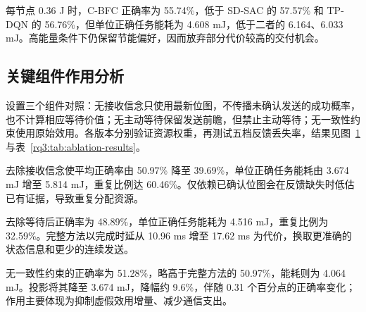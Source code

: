 每节点 0.36 J 时，C-BFC 正确率为 55.74\%，低于 SD-SAC 的 57.57\% 和 TP-DQN 的 56.76\%，但单位正确任务能耗为 4.608 mJ，低于二者的 6.164、6.033 mJ。高能量条件下仍保留节能偏好，因而放弃部分代价较高的交付机会。

\FloatBarrier
\subsection{关键组件作用分析}
\label{rq3:subsec:ablation}

设置三个组件对照：无接收信念只使用最新位图，不传播未确认发送的成功概率，也不计算相应等待价值；无主动等待保留发送前瞻，但禁止主动等待；无一致性约束使用原始效用。各版本分别验证资源权重，再测试五档反馈丢失率，结果见图~\ref{rq3:fig:ablation} 与表~\ref{rq3:tab:ablation-results}。

\begin{figure}[!htbp]
  \centering
  \par\vspace{2pt}{\footnotesize 完整方法与无接收信念、无主动等待、无一致性约束三个版本分别比较，子图指标与前四组一致。}
  \label{rq3:fig:ablation}
\end{figure}



去除接收信念使平均正确率由 50.97\% 降至 39.69\%，单位正确任务能耗由 3.674 mJ 增至 5.814 mJ，重复比例达 60.46\%。仅依赖已确认位图会在反馈缺失时低估已有证据，导致重复分配资源。

去除等待后正确率为 48.89\%，单位正确任务能耗为 4.516 mJ，重复比例为 32.59\%。完整方法以完成时延从 10.96 ms 增至 17.62 ms 为代价，换取更准确的状态信息和更少的连续发送。

无一致性约束的正确率为 51.28\%，略高于完整方法的 50.97\%，能耗则为 4.064 mJ。投影将其降至 3.674 mJ，降幅约 9.6\%，伴随 0.31 个百分点的正确率变化；作用主要体现为抑制虚假效用增量、减少通信支出。

